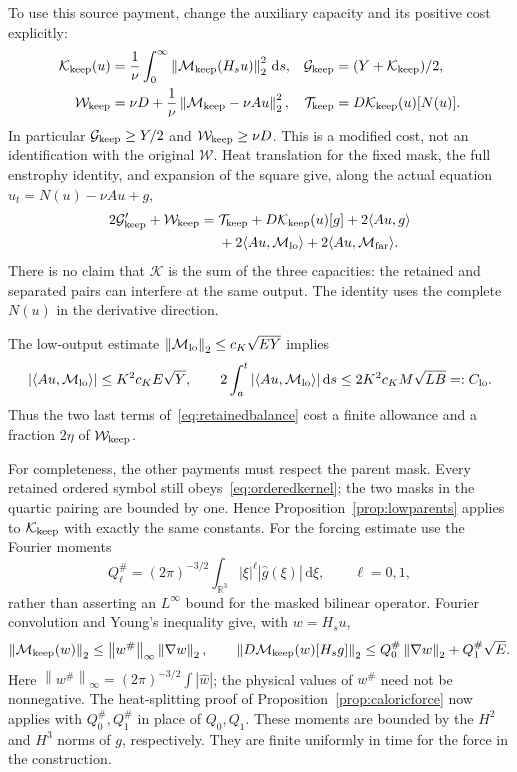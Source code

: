 \documentclass[11pt]{article}
\newcommand{\R}{\mathbb R}
\newcommand{\dd}{\,\mathrm d}
\newcommand{\norm}[1]{\left\lVert#1\right\rVert}
\begin{document}
To use this source payment, change the auxiliary capacity and its
positive cost explicitly:
\begin{align*}
 \mathcal K_{\rm keep}(u)
   &=\frac1\nu\int_0^\infty\norm{\mathcal M_{\rm keep}(H_su)}_2^2\dd s,
 &\mathcal G_{\rm keep}&=(Y+\mathcal K_{\rm keep})/2,\\
 \mathcal W_{\rm keep}
   &=\nu D+\frac1\nu\norm{\mathcal M_{\rm keep}-\nu Au}_2^2,
 &\mathcal T_{\rm keep}&=D\mathcal K_{\rm keep}(u)[N(u)].
\end{align*}
In particular $\mathcal G_{\rm keep}\geq Y/2$ and
$\mathcal W_{\rm keep}\geq\nu D$. This is a modified cost, not an
identification with the original $\mathcal W$. Heat translation for
the fixed mask, the full enstrophy identity, and expansion of the square
give, along the actual equation $u_t=N(u)-\nu Au+g$,
\begin{equation}\label{eq:retainedbalance}
\begin{split}
 2\mathcal G_{\rm keep}'+\mathcal W_{\rm keep}
 ={}&\mathcal T_{\rm keep}+D\mathcal K_{\rm keep}(u)[g]
        +2\langle Au,g\rangle\\
    &+2\langle Au,\mathcal M_{\rm lo}\rangle
        +2\langle Au,\mathcal M_{\rm far}\rangle .
\end{split}
\end{equation}
There is no claim that $\mathcal K$ is the sum of the three capacities:
the retained and separated pairs can interfere at the same output.
The identity uses the complete $N(u)$ in the derivative direction.

The low-output estimate $\norm{\mathcal M_{\rm lo}}_2\leq c_K\sqrt{EY}$
implies
\[
 |\langle Au,\mathcal M_{\rm lo}\rangle|
 \leq K^2c_KE\sqrt Y,\qquad
 2\int_a^t|\langle Au,\mathcal M_{\rm lo}\rangle|\dd s
 \leq 2K^2c_KM\sqrt{LB}=:C_{\rm lo}.
\]
Thus the two last terms of~\eqref{eq:retainedbalance} cost a finite
allowance and a fraction $2\eta$ of $\mathcal W_{\rm keep}$.

For completeness, the other payments must respect the parent mask.
Every retained ordered symbol still obeys~\eqref{eq:orderedkernel};
the two masks in the quartic pairing are bounded by one. Hence
Proposition~\ref{prop:lowparents} applies to $\mathcal K_{\rm keep}$
with exactly the same constants. For the forcing estimate use the
Fourier moments
\[
 Q_\ell^\#=(2\pi)^{-3/2}
                \int_{\R^3}|\xi|^\ell|\widehat g(\xi)|\dd\xi,
 \qquad \ell=0,1,
\]
rather than asserting an $L^\infty$ bound for the masked bilinear operator.
Fourier convolution and Young's inequality give, with $w=H_su$,
\[
 \norm{\mathcal M_{\rm keep}(w)}_2
 \leq\norm{w^\#}_\infty\norm{\nabla w}_2,\qquad
 \norm{D\mathcal M_{\rm keep}(w)[H_sg]}_2
 \leq Q_0^\#\norm{\nabla w}_2+Q_1^\#\sqrt E.
\]
Here $\norm{w^\#}_\infty=(2\pi)^{-3/2}\int|\widehat w|$;
the physical values of $w^\#$ need not be nonnegative.
The heat-splitting proof of Proposition~\ref{prop:caloricforce} now
applies with $Q_0^\#,Q_1^\#$ in place of $Q_0,Q_1$. These moments are
bounded by the $H^2$ and $H^3$ norms of $g$, respectively.
They are finite uniformly in time for the force in the construction.
\end{document}
